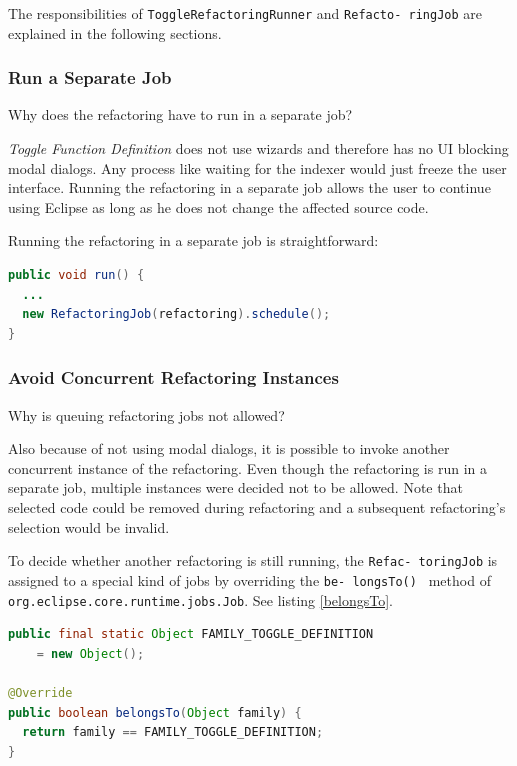 The responsibilities of \texttt{ToggleRefactoringRunner} and 
\texttt{Refacto- ringJob} are explained in the following sections.

\subsubsection{Run a Separate Job}
Why does the refactoring have to run in a separate job?

\textit{Toggle Function Definition} does not use wizards and therefore 
has no UI blocking modal dialogs. Any process like waiting for the indexer would 
just freeze the user interface. Running the refactoring in a separate job 
allows the user to continue using Eclipse as long as he does not change the 
affected source code.

Running the refactoring in a separate job is straightforward:
\begin{lstlisting}[caption={ToggleRefactoringRunner starting the job},
label={jobstart}, language=Java]
public void run() {
  ...
  new RefactoringJob(refactoring).schedule();
}
\end{lstlisting}

\subsubsection{Avoid Concurrent Refactoring Instances}
Why is queuing refactoring jobs not allowed?

Also because of not using modal dialogs, it is possible to invoke another 
concurrent instance of the refactoring. Even though the refactoring is run 
in a separate job, multiple instances were decided not to be allowed. Note 
that selected code could be removed during refactoring and a subsequent 
refactoring's selection would be invalid.

To decide whether another refactoring is still running, the \texttt{Refac- 
toringJob} is assigned to a special kind of jobs by overriding the \texttt{be- 
longsTo() } method of \texttt{org.eclipse.core.runtime.jobs.Job}. See listing 
\ref{belongsTo}.

\begin{lstlisting}[caption={RefactoringJob is assigned to a separate family of 
jobs},label={belongsTo},language=java]
public final static Object FAMILY_TOGGLE_DEFINITION
    = new Object();

@Override
public boolean belongsTo(Object family) {
  return family == FAMILY_TOGGLE_DEFINITION;
}
\end{lstlisting}

